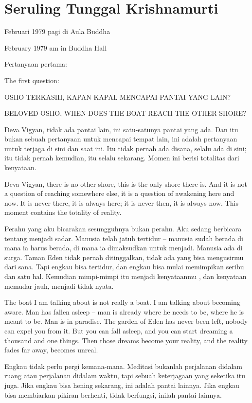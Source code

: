 \chapter{Seruling Tunggal Krishnamurti} %

 Februari 1979 pagi di Aula Buddha

 February 1979 am in Buddha Hall

\bahasa
Pertanyaan pertama:

\english
The first question:

\bahasa
OSHO TERKASIH,
KAPAN KAPAL MENCAPAI PANTAI YANG LAIN?

\english
BELOVED OSHO,
WHEN DOES THE BOAT REACH THE OTHER SHORE?

\bahasa
Deva Vigyan, tidak ada pantai lain, ini satu-satunya pantai yang ada. Dan itu bukan sebuah pertanyaan untuk mencapai tempat lain, ini adalah pertanyaan untuk terjaga di sini dan saat ini. Itu tidak pernah ada disana, selalu ada di sini; itu tidak pernah kemudian, itu selalu sekarang. Momen ini berisi totalitas dari kenyataan.

\english
Deva Vigyan, there is no other shore, this is the only shore there is. And it is not a question of reaching somewhere else, it is a question of awakening here and now. It is never there, it is always here; it is never then, it is always now. This moment contains the totality of reality.

\bahasa
Perahu yang aku bicarakan sesungguhnya bukan perahu. Aku sedang berbicara tentang menjadi sadar. Manusia telah jatuh tertidur -- manusia sudah berada di mana ia harus berada, di mana ia dimaksudkan untuk menjadi. Manusia ada di surga. Taman Eden tidak pernah ditinggalkan, tidak ada yang bisa mengusirmu dari sana. Tapi engkau bisa tertidur, dan engkau bisa mulai memimpikan seribu dan satu hal. Kemudian mimpi-mimpi itu menjadi kenyataanmu , dan kenyataan memudar jauh, menjadi tidak nyata.

\english
The boat I am talking about is not really a boat. I am talking about becoming aware. Man has fallen asleep -- man is already where he needs to be, where he is meant to be. Man is in paradise. The garden of Eden has never been left, nobody can expel you from it. But you can fall asleep, and you can start dreaming a thousand and one things. Then those dreams become your reality, and the reality fades far away, becomes unreal.

\bahasa
Engkau tidak perlu pergi kemana-mana. Meditasi bukanlah perjalanan didalam ruang atau perjalanan didalam waktu, tapi sebuah keterjagaan yang seketika itu juga. Jika engkau bisa hening sekarang, ini adalah pantai lainnya. Jika engkau bisa membiarkan pikiran berhenti, tidak berfungsi, inilah pantai lainnya.

